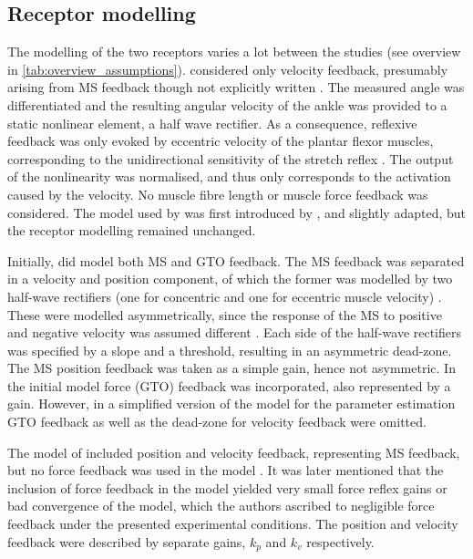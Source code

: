 \subsection{Receptor modelling}
The modelling of the two receptors varies a lot between the studies (see overview in \autoref{tab:overview_assumptions}). \citeauthor{mirbagheri_intrinsic_2000} considered only velocity feedback, presumably arising from MS feedback though not explicitly written \cite{mirbagheri_intrinsic_2000}. The measured angle was differentiated and the resulting angular velocity of the ankle was provided to a static nonlinear element, a half wave rectifier. As a consequence, reflexive feedback was only evoked by eccentric velocity of the plantar flexor muscles, corresponding to the unidirectional sensitivity of the stretch reflex \cite{kearney_system_1983}. The output of the nonlinearity was normalised, and thus only corresponds to the activation caused by the velocity. No muscle fibre length or muscle force feedback was considered. The model used by \citeauthor{mirbagheri_intrinsic_2000} was first introduced by \citeauthor{kearney_identification_1997}, and slightly adapted, but the receptor modelling remained unchanged. 

Initially, \citeauthor{zhang_simultaneous_1997} did model both MS and GTO feedback. The MS feedback was separated in a velocity and position component, of which the former was modelled by two half-wave rectifiers (one for concentric and one for eccentric muscle velocity) \cite{zhang_simultaneous_1997}. These were modelled asymmetrically, since the response of the MS to positive and negative velocity was assumed different \cite{houk_neural_1981}. Each side of the half-wave rectifiers was specified by a slope and a threshold, resulting in an asymmetric dead-zone. The MS position feedback was taken as a simple gain, hence not asymmetric. In the initial model force (GTO) feedback was incorporated, also represented by a gain. However, in a simplified version of the model for the parameter estimation GTO feedback as well as the dead-zone for velocity feedback were omitted. %

The model of \citeauthor{van_der_helm_identification_2002} included position and velocity feedback, representing MS feedback, but no force feedback was used in the model \cite{van_der_helm_identification_2002}. It was later mentioned that the inclusion of force feedback in the model yielded very small force reflex gains or bad convergence of the model, which the authors ascribed to negligible force feedback under the presented experimental conditions. The position and velocity feedback were described by separate gains, $k_p$ and $k_v$ respectively. 

